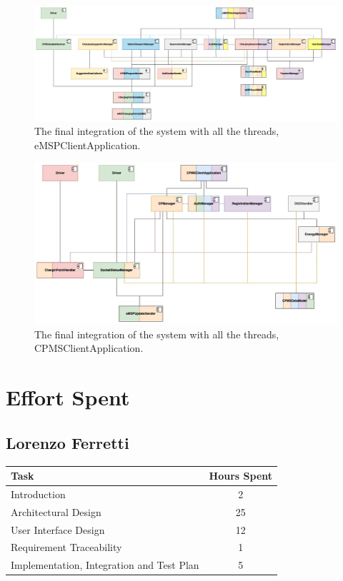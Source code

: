 \documentclass{Configuration_Files/PoliMi3i_thesis}
\begin{document}
\begin{figure}[H]
    \centering
    \includegraphics[width=1\textwidth]{Images/test/test-eMSP-thread.jpg}
    \caption{The final integration of the system with all the threads, eMSPClientApplication.}
\end{figure}

\begin{figure}[H]
    \centering
    \includegraphics[width=1\textwidth]{Images/test/test-CPMS-thread.jpg}
    \caption{The final integration of the system with all the threads, CPMSClientApplication.
}
\end{figure}

\chapter{Effort Spent}

\section{Lorenzo Ferretti}

\begin{table}[H]
    \centering 
    \begin{tabular}{|l|c|}
    \hline
    \rowcolor{bluepoli!40}
    \textbf{Task} & \textbf{Hours Spent} \T\B \\
    \hline
    Introduction & 2 \T\B \\
    \hline
    Architectural Design & 25\T\B \\
    \hline
    User Interface Design & 12\T\B \\
    \hline
    Requirement Traceability & 1\T\B \\
    \hline
    Implementation, Integration and Test Plan & 5\T\B \\
    \hline
    \end{tabular}
\end{table}
\end{document}
